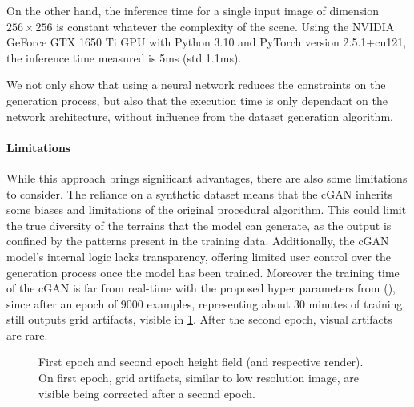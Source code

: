 On the other hand, the inference time for a single input image of dimension $256 \times 256$ is constant whatever the complexity of the scene. Using the NVIDIA GeForce GTX 1650 Ti GPU with Python 3.10 and PyTorch version 2.5.1+cu121, the inference time measured is 5ms (std 1.1ms). 

We not only show that using a neural network reduces the constraints on the generation process, but also that the execution time is only dependant on the network architecture, without influence from the dataset generation algorithm. 





\paragraph{Limitations} 
While this approach brings significant advantages, there are also some limitations to consider. The reliance on a synthetic dataset means that the cGAN inherits some biases and limitations of the original procedural algorithm. This could limit the true diversity of the terrains that the model can generate, as the output is confined by the patterns present in the training data. Additionally, the cGAN model's internal logic lacks transparency, offering limited user control over the generation process once the model has been trained. Moreover the training time of the cGAN is far from real-time with the proposed hyper parameters from (\cite{Isola2017}), since after an epoch of 9000 examples, representing about 30 minutes of training, still outputs grid artifacts, visible in \cref{fig:coral-island_first-epoch}. After the second epoch, visual artifacts are rare. 

\begin{figure}
    \caption{First epoch and second epoch height field (and respective render). On first epoch, grid artifacts, similar to low resolution image, are visible being corrected after a second epoch. }
    \label{fig:coral-island_first-epoch}
\end{figure}

